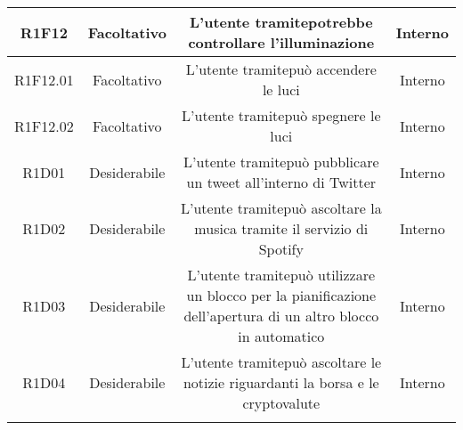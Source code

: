\begin{tabularx}{\textwidth}{|C|C|C|C|}
	\hline	
	R1F12& Facoltativo  &L'utente tramitepotrebbe controllare l'illuminazione &Interno \\
	\hline
	R1F12.01& Facoltativo  &L'utente tramitepuò accendere le luci &Interno \\
	\hline
	R1F12.02& Facoltativo  &L'utente tramitepuò spegnere le luci &Interno \\
	\hline
	R1D01&Desiderabile  &L'utente tramitepuò pubblicare un tweet all'interno di Twitter &Interno \\
	\hline
	R1D02&Desiderabile  &L'utente tramitepuò ascoltare la musica tramite il servizio di Spotify &Interno \\
	\hline
	R1D03&Desiderabile  &L'utente tramitepuò utilizzare un blocco per la pianificazione dell'apertura di un altro blocco in automatico &Interno \\
	\hline
	R1D04&Desiderabile  &L'utente tramitepuò ascoltare le notizie riguardanti la borsa e le cryptovalute &Interno \\
	\hline
	\caption{Tabella requisiti funzionali}
\end{tabularx}


